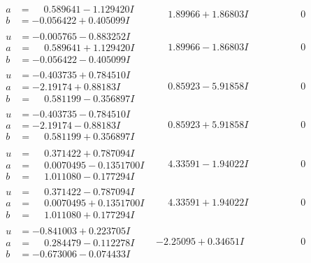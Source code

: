 \documentclass[1p]{elsarticle_modified}
\theoremstyle{definition}
\begin{document}
$$\begin{array}{c|c|c}
\begin{aligned}
a &= \phantom{-}0.589641 - 1.129420 I \\
b &= -0.056422 + 0.405099 I\end{aligned}
 & \phantom{-}1.89966 + 1.86803 I & \phantom{-0.000000 } 0 \\ \hline\begin{aligned}
u &= -0.005765 - 0.883252 I \\
a &= \phantom{-}0.589641 + 1.129420 I \\
b &= -0.056422 - 0.405099 I\end{aligned}
 & \phantom{-}1.89966 - 1.86803 I & \phantom{-0.000000 } 0 \\ \hline\begin{aligned}
u &= -0.403735 + 0.784510 I \\
a &= -2.19174 + 0.88183 I \\
b &= \phantom{-}0.581199 - 0.356897 I\end{aligned}
 & \phantom{-}0.85923 - 5.91858 I & \phantom{-0.000000 } 0 \\ \hline\begin{aligned}
u &= -0.403735 - 0.784510 I \\
a &= -2.19174 - 0.88183 I \\
b &= \phantom{-}0.581199 + 0.356897 I\end{aligned}
 & \phantom{-}0.85923 + 5.91858 I & \phantom{-0.000000 } 0 \\ \hline\begin{aligned}
u &= \phantom{-}0.371422 + 0.787094 I \\
a &= \phantom{-}0.0070495 - 0.1351700 I \\
b &= \phantom{-}1.011080 - 0.177294 I\end{aligned}
 & \phantom{-}4.33591 - 1.94022 I & \phantom{-0.000000 } 0 \\ \hline\begin{aligned}
u &= \phantom{-}0.371422 - 0.787094 I \\
a &= \phantom{-}0.0070495 + 0.1351700 I \\
b &= \phantom{-}1.011080 + 0.177294 I\end{aligned}
 & \phantom{-}4.33591 + 1.94022 I & \phantom{-0.000000 } 0 \\ \hline\begin{aligned}
u &= -0.841003 + 0.223705 I \\
a &= \phantom{-}0.284479 - 0.112278 I \\
b &= -0.673006 - 0.074433 I\end{aligned}
 & -2.25095 + 0.34651 I & \phantom{-0.000000 } 0 \\ \hline\begin{aligned}

\end{aligned}
\end{array}$$
\end{document}
